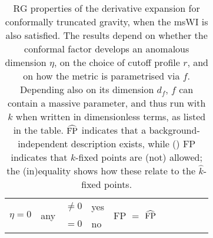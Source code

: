 \documentclass[11pt]{book} %
\newcommand{\hk}{\hat k}
\numberwithin{equation}{chapter}
\begin{document}
\begin{table}[]
\begin{center}
\begin{tabular}{ r@{\hskip 10mm}  l  r  l@{\hskip 10mm}  c  c  c  c  c  c  c }
      \multirow{2}{*}{$\eta =0$}    & \multirow{2}{*}{any} & $\ne0$          & yes                      & \multicolumn{2}{c}{\multirow{2}{*}{FP $=$ $\widehat{\rm FP}$}}                                   \\[0.5mm]
                                    &                      & $=0$            & no                       & \multicolumn{2}{c}{}                                                                             \\
      \bottomrule
    \end{tabular}
  \end{center}
  \caption[RG properties of the derivative expansion for conformally truncated gravity]
  {
    RG properties of the derivative expansion for conformally truncated gravity,
    when the msWI is also satisfied.
    The results depend on whether the conformal factor develops an anomalous dimension $\eta$,
    on the choice of cutoff profile $r$, and on how the metric is parametrised via $f$.
    Depending also on its dimension $d_f$, $f$ can contain a massive parameter,
    and thus run with $k$ when written in dimensionless terms, as listed in the table.
    $\widehat{\rm FP}$ indicates that a background-independent description exists,
    while () FP  indicates that $k$-fixed points are (not) allowed;
    the (in)equality shows how these relate to the $\hk$-fixed points.
  }
  \label{table:summary}
\end{table}
\end{document}

